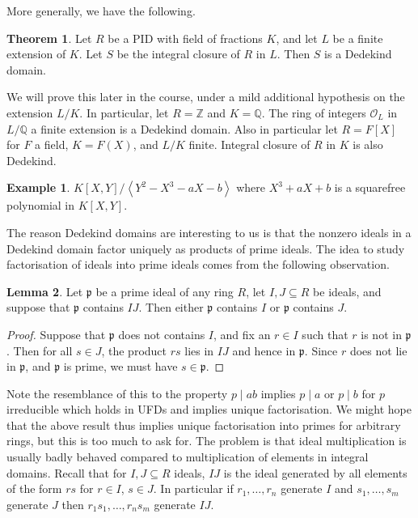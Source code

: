 \documentclass{article}
\newcommand{\Z}{\mathbb{Z}}
\newcommand{\Q}{\mathbb{Q}}
\newcommand{\rb}[1]{\left( #1 \right)}
\renewcommand{\sb}[1]{\left[ #1 \right]}
\newcommand{\ab}[1]{\left\langle #1 \right\rangle}
\theoremstyle{definition}\newtheorem{definition}{Definition}[subsection]
\theoremstyle{definition}\newtheorem{remark}[definition]{Remark}
\theoremstyle{definition}\newtheorem*{example}{Example}
\theoremstyle{definition}\newtheorem*{note}{Note}
\newtheorem{lemma}[definition]{Lemma}
\newtheorem{theorem}[definition]{Theorem}
\begin{document}
More generally, we have the following.

\begin{theorem}
Let $ R $ be a PID with field of fractions $ K $, and let $ L $ be a finite extension of $ K $. Let $ S $ be the integral closure of $ R $ in $ L $. Then $ S $ is a Dedekind domain.
\end{theorem}

We will prove this later in the course, under a mild additional hypothesis on the extension $ L / K $. In particular, let $ R = \Z $ and $ K = \Q $. The ring of integers $ \mathcal{O}_L $ in $ L / \Q $ a finite extension is a Dedekind domain. Also in particular let $ R = F\sb{X} $ for $ F $ a field, $ K = F\rb{X} $, and $ L / K $ finite. Integral closure of $ R $ in $ K $ is also Dedekind.

\begin{example}
$ K\sb{X, Y} / \ab{Y^2 - X^3 - aX - b} $ where $ X^3 + aX + b $ is a squarefree polynomial in $ K\sb{X, Y} $.
\end{example}

The reason Dedekind domains are interesting to us is that the nonzero ideals in a Dedekind domain factor uniquely as products of prime ideals. The idea to study factorisation of ideals into prime ideals comes from the following observation.

\begin{lemma}
\label{lem:11.1.3}
Let $ \mathfrak{p} $ be a prime ideal of any ring $ R $, let $ I, J \subseteq R $ be ideals, and suppose that $ \mathfrak{p} $ contains $ IJ $. Then either $ \mathfrak{p} $ contains $ I $ or $ \mathfrak{p} $ contains $ J $.
\end{lemma}

\begin{proof}
Suppose that $ \mathfrak{p} $ does not contains $ I $, and fix an $ r \in I $ such that $ r $ is not in $ \mathfrak{p} $. Then for all $ s \in J $, the product $ rs $ lies in $ IJ $ and hence in $ \mathfrak{p} $. Since $ r $ does not lie in $ \mathfrak{p} $, and $ \mathfrak{p} $ is prime, we must have $ s \in \mathfrak{p} $.
\end{proof}

Note the resemblance of this to the property $ p \mid ab $ implies $ p \mid a $ or $ p \mid b $ for $ p $ irreducible which holds in UFDs and implies unique factorisation. We might hope that the above result thus implies unique factorisation into primes for arbitrary rings, but this is too much to ask for. The problem is that ideal multiplication is usually badly behaved compared to multiplication of elements in integral domains. Recall that for $ I, J \subseteq R $ ideals, $ IJ $ is the ideal generated by all elements of the form $ rs $ for $ r \in I $, $ s \in J $. In particular if $ r_1, \dots, r_n $ generate $ I $ and $ s_1, \dots, s_m $ generate $ J $ then $ r_1s_1, \dots, r_ns_m $ generate $ IJ $.
\end{document}

